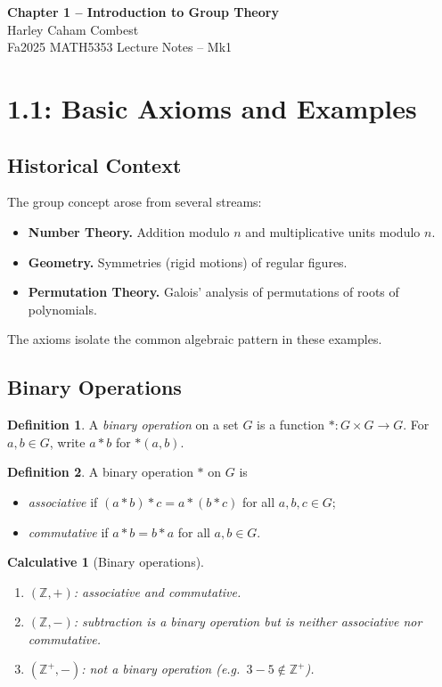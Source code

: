 \documentclass[12pt]{article}
\newtheorem{calculative}[theorem]{Calculative}
\theoremstyle{definition}
\newtheorem{definition}{Definition}
\begin{document}
\begin{center}
\Large\textbf{Chapter 1 – Introduction to Group Theory} \\
\large Harley Caham Combest \\
\large Fa2025 MATH5353 Lecture Notes – Mk1
\end{center}

\vspace{1em}

\dotfill
\section*{1.1: Basic Axioms and Examples}
\dotfill

\subsection*{Historical Context}
The group concept arose from several streams:
\begin{itemize}
    \item \textbf{Number Theory.} Addition modulo $n$ and multiplicative units modulo $n$.
    \item \textbf{Geometry.} Symmetries (rigid motions) of regular figures.
    \item \textbf{Permutation Theory.} Galois’ analysis of permutations of roots of polynomials.
\end{itemize}
The axioms isolate the common algebraic pattern in these examples.

\subsection*{Binary Operations}

\begin{definition}
A \emph{binary operation} on a set $G$ is a function $*\colon G\times G\to G$. For $a,b\in G$,
write $a*b$ for $*(a,b)$.
\end{definition}

\begin{definition}
A binary operation $*$ on $G$ is
\begin{itemize}
    \item \emph{associative} if $(a*b)*c=a*(b*c)$ for all $a,b,c\in G$;
    \item \emph{commutative} if $a*b=b*a$ for all $a,b\in G$.
\end{itemize}
\end{definition}

\begin{calculative}[Binary operations]
\begin{enumerate}
    \item $(\mathbb{Z},+)$: associative and commutative.
    \item $(\mathbb{Z},-)$: subtraction is a binary operation but is neither associative nor commutative.
    \item $(\mathbb{Z}^+,-)$: not a binary operation (e.g.\ $3-5\notin\mathbb{Z}^+$).
\end{enumerate}
\end{calculative}
\end{document}
